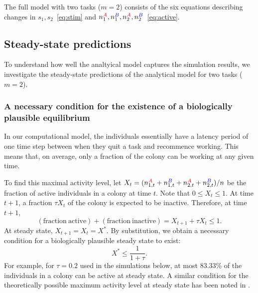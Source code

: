 \documentclass[11pt]{article}
\newcommand{\A}{{\color{red}A}}
\newcommand{\B}{{\color{blue}B}}
\begin{document}
\begin{appendices}
The full model with two tasks ($m=2$) consists of the six equations describing changes in $s_1, s_2$~\eqref{eq:stim} and $ n_1^{\A}, n_1^{\B}, n_2^{\A}, n_2^{\B}$~\eqref{eq:active}. 

\subsection{Steady-state predictions}
To understand how well the analtyical model captures the simulation results, we investigate the steady-state predictions of the analytical model for two tasks ($m=2$).

\subsubsection{A necessary condition for the existence of a biologically plausible equilibrium} \label{sec:maxactivity}

In our computational model, the individuals essentially have a latency period of one time step between when they quit a task and recommence working. This means that, on average, only a fraction of the colony can be working at any given time.

To find this maximal activity level, let $X_t = (n_{1,t}^{\A}+ n_{1,t}^{\B}+ n_{2,t}^{\A}+n_{2,t}^{\B})/n$ be the fraction of active individuals in a colony at time $t$. Note that $0\leq X_t\leq 1$. At time $t+1$, a fraction $\tau X_t$ of the colony is expected to be inactive. Therefore, at time $t+1$,
\begin{equation}
    \mathrm{(fraction\ active)} + \mathrm{(fraction\ inactive)}  = X_{t+1} + \tau X_t \leq 1.
\end{equation}
At steady state, $X_{t+1} = X_{t} = X^*$. By substitution, we obtain a necessary condition for a biologically plausible steady state to exist:
\begin{equation}
    X^* \leq \frac{1}{1+\tau}. \label{eq:maxactivity}
\end{equation}
For example, for $\tau = 0.2$ used in the simulations below, at most $83.33$\% of the individuals in a colony can be active at steady state.
A similar condition for the theoretically possible maximum activity level at steady state has been noted in \cite{gautrais02}.


\end{appendices}
\end{document}

